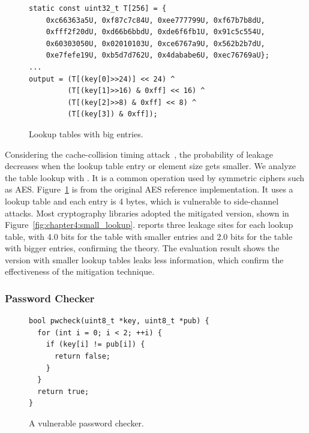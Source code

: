 \begin{figure}[h]
\centering
    \begin{lstlisting}[xleftmargin=.05\textwidth, xrightmargin=.05\textwidth, frame=none]
static const uint32_t T[256] = {
    0xc66363a5U, 0xf87c7c84U, 0xee777799U, 0xf67b7b8dU,
    0xfff2f20dU, 0xd66b6bbdU, 0xde6f6fb1U, 0x91c5c554U,
    0x60303050U, 0x02010103U, 0xce6767a9U, 0x562b2b7dU,
    0xe7fefe19U, 0xb5d7d762U, 0x4dababe6U, 0xec76769aU};
...
output = (T[(key[0]>>24)] << 24) ^
         (T[(key[1]>>16) & 0xff] << 16) ^
         (T[(key[2]>>8) & 0xff] << 8) ^
         (T[(key[3]) & 0xff]);
\end{lstlisting}
  \caption{Lookup tables with big entries.}\label{fig:chapter4:big_lookup}
\end{figure}


Considering the cache-collision timing attack~\cite{Bonneau11894063_16}, the
probability of leakage decreases when the lookup table entry or element size gets
smaller. We analyze the table lookup with \tool{}. It is a common operation used by symmetric ciphers such as AES. Figure~\ref{fig:chapter4:big_lookup} is from the original AES reference implementation. It uses a lookup table and each entry is 4 bytes, which is vulnerable to side-channel attacks. Most cryptography libraries adopted the mitigated version, shown in Figure~\ref{fig:chapter4:small_lookup}. \tool{} reports three leakage sites for
each lookup table, with 4.0 bits for the table with smaller entries and 2.0
bits for the table with bigger entries, confirming the theory.
The evaluation result shows the version with smaller lookup tables leaks less information, which confirm the effectiveness of the mitigation technique. 



\subsubsection*{Password Checker}

\begin{figure}[h]
    \begin{lstlisting}[xleftmargin=.2\textwidth, xrightmargin=.0\textwidth, frame=none]
bool pwcheck(uint8_t *key, uint8_t *pub) {
  for (int i = 0; i < 2; ++i) {
    if (key[i] != pub[i]) {
      return false;
    }
  }
  return true;
}
\end{lstlisting}\caption{A vulnerable password checker.}\label{fig:chapter4:pwcheck1}
\end{figure}

